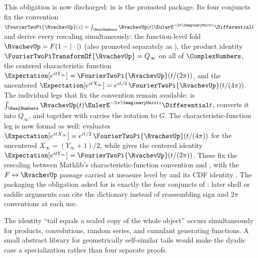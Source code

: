 \documentclass[11pt,oneside]{article}
\numberwithin{equation}{section}
\theoremstyle{definition}
\theoremstyle{remark}
\begin{document}
This obligation is now discharged:  in
 is the promoted package.  Its four conjuncts fix the
convention \(\FourierTwoPi{\RvachevUp}(z)=\int_\RealNumbers\RvachevUp(t)\EulerE^{-2\pi\ImaginaryUnit tz}\Differential t\) and derive every rescaling
simultaneously: the function-level fold \(\RvachevUp=F(1-|\cdot|)\) (also promoted separately as
), the product identity
\(\FourierTwoPiTransformOf{\RvachevUp}=Q_\infty\) on all of \(\ComplexNumbers\), the centered characteristic function
\(\Expectation[e^{itY_\infty}]=\FourierTwoPi{\RvachevUp}(t/(2\pi))\), and the uncentered
\(\Expectation[e^{itX_\infty}]=e^{it/2}\,\FourierTwoPi{\RvachevUp}(t/(4\pi))\).  The individual legs that fix the
convention remain available:  is
$\int_\RealNumbers\RvachevUp(t)\EulerE^{-2\pi\ImaginaryUnit tz}\Differential t$,
 converts it into $Q_\infty$, and
 together with
 carries the rotation to $G$.  The
characteristic-function leg is now formal as well:
 evaluates
\(\Expectation[e^{itX_\infty}]=e^{it/2}\,\FourierTwoPi{\RvachevUp}(t/(4\pi))\) for the uncentered
\(X_\infty=(Y_\infty+1)/2\), while
 gives the centered identity
\(\Expectation[e^{itY_\infty}]=\FourierTwoPi{\RvachevUp}(t/(2\pi))\).  These fix the rescaling between
Mathlib's characteristic-function convention and , with
the \(F\leftrightarrow\RvachevUp\) passage carried at measure level by
 and its CDF identity
.  The packaging the obligation asked for is exactly the four
conjuncts of : later shell or saddle arguments
can cite the dictionary instead of reassembling sign and \(2\pi\) conventions at each use.

\begin{obligation}
The identity ``tail equals a scaled copy of the whole object'' occurs simultaneously for
products, convolutions, random series, and cumulant generating functions.  A small abstract
library for geometrically self-similar tails would make the dyadic case a specialization
rather than four separate proofs.
\end{obligation}
\end{document}
